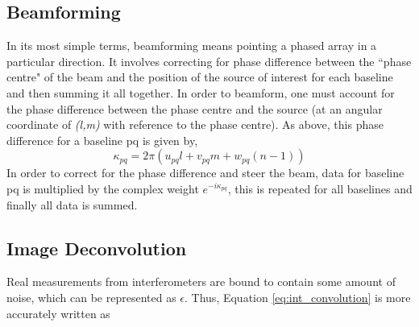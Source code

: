 \subsection{Beamforming}
\label{sec:beamform_theory}
In its most simple terms, beamforming  means pointing a phased array in a particular direction. It involves correcting for phase difference between the ``phase centre" of the beam and the position of the source of interest for each baseline and then summing it all together. 
In order to beamform, one must account for the phase difference between the phase centre and the source (at an angular coordinate of \textit{(l,m)} with reference to the phase centre). As above, this phase difference for a baseline pq is given by, 
$$\kappa_{pq} = 2\pi(u_{pq}l+v_{pq}m+w_{pq}(n-1))$$
In order to correct for the phase difference and steer the beam, data for baseline pq is multiplied by the complex weight $e^{-i\kappa_{pq}}$, this is repeated for all baselines and finally all data is summed.

\subsection{Image Deconvolution}
\label{sec:imaging}
Real measurements from interferometers are bound to contain some amount of noise, which can be represented as $\epsilon$. Thus, Equation \ref{eq:int_convolution} is more accurately written as
 
